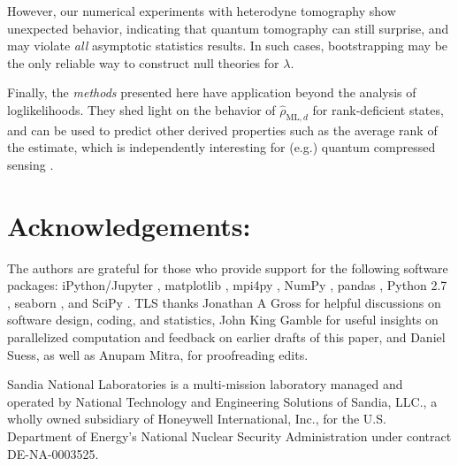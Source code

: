 \documentclass[aps,pra, twocolumn]{revtex4-1}
\newcommand{\rhohat}{\hat{\rho}}
\newcommand{\rhoML}[1]{\rhohat_{\scriptscriptstyle{\mathrm{ML},#1}}}
\begin{document}
However, our numerical experiments with heterodyne tomography show unexpected behavior, indicating that quantum tomography can still surprise, and may violate \emph{all} asymptotic statistics results.  In such cases, bootstrapping \cite{Efron1979, Higgins2004} may be the only reliable way to construct null theories for $\lambda$. 

Finally, the \emph{methods} presented here have application beyond the analysis of loglikelihoods.  They shed light on the behavior of $\rhoML{d}$ for rank-deficient states, and can be used to predict other derived properties such as the average rank of the estimate, which is independently interesting for (e.g.) quantum compressed sensing \cite{Flammia2012a, Steffens2016, Kalev2015, Kalev2015a}.

\section{Acknowledgements:} The authors are grateful for those who provide support for the following software packages: iPython/Jupyter \cite{Perez}, matplotlib
\cite{Hunter2007}, mpi4py \cite{Dalcin2011},  NumPy \cite{VanDerWalt2011}, pandas \cite{mckinney2010}, Python 2.7 
\cite{vanRossum}, seaborn \cite{Waskom2016}, and SciPy \cite{Oliphant2007a}. TLS thanks Jonathan A Gross for helpful 
discussions on software design, coding, and statistics, John King Gamble for useful insights on parallelized 
computation and feedback on earlier drafts of this paper, and Daniel Suess, as well as Anupam Mitra, for proofreading edits.

Sandia National Laboratories is a multi-mission laboratory managed and operated by National Technology and Engineering Solutions of Sandia, LLC., a wholly owned subsidiary of Honeywell International, Inc., for the U.S. Department of Energy's National Nuclear Security Administration under contract DE-NA-0003525.



\end{document}

